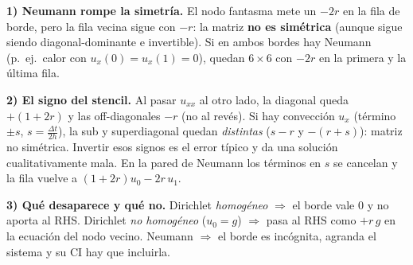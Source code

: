 \begin{truco}
\textbf{1) Neumann rompe la simetría.} El nodo fantasma mete un $-2r$ en la fila de borde, pero la fila vecina sigue con $-r$: la matriz \textbf{no es simétrica} (aunque sigue siendo diagonal-dominante e invertible). Si en ambos bordes hay Neumann (p.\ ej.\ calor con $u_x(0)=u_x(1)=0$), quedan $6\times6$ con $-2r$ en la primera y la última fila.

\textbf{2) El signo del stencil.} Al pasar $u_{xx}$ al otro lado, la diagonal queda \textbf{$+(1+2r)$} y las off-diagonales \textbf{$-r$} (no al revés). Si hay convección $u_x$ (término $\pm s$, $s=\tfrac{\Delta t}{2h}$), la sub y superdiagonal quedan \emph{distintas} ($s-r$ y $-(r+s)$): matriz no simétrica. Invertir esos signos es el error típico y da una solución cualitativamente mala. En la pared de Neumann los términos en $s$ se cancelan y la fila vuelve a $(1+2r)u_0-2r\,u_1$.

\textbf{3) Qué desaparece y qué no.} Dirichlet \emph{homogéneo} $\Rightarrow$ el borde vale $0$ y no aporta al RHS. Dirichlet \emph{no homogéneo} ($u_0=g$) $\Rightarrow$ pasa al RHS como $+r\,g$ en la ecuación del nodo vecino. Neumann $\Rightarrow$ el borde es incógnita, agranda el sistema y su CI hay que incluirla.
\end{truco}
